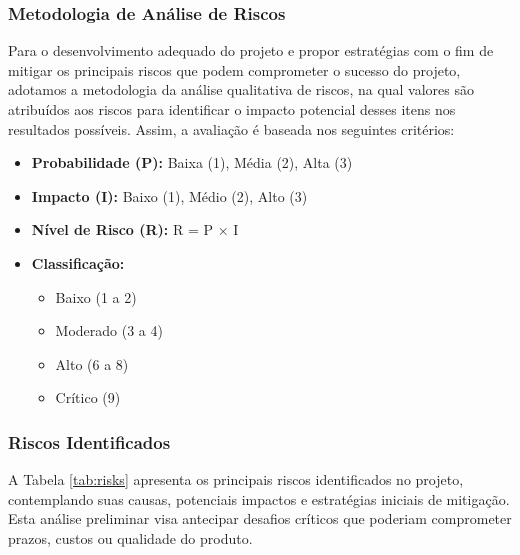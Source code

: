 \documentclass[a5paper, 12pt]{article}
\begin{document}
\subsubsection{Metodologia de Análise de Riscos}

Para o desenvolvimento adequado do projeto e propor estratégias com o fim de mitigar os principais riscos que podem comprometer o sucesso do projeto, adotamos a metodologia da análise qualitativa de riscos, na qual valores são atribuídos aos riscos para identificar o impacto potencial desses itens nos resultados possíveis. Assim, a avaliação é baseada nos seguintes critérios:

\begin{itemize}
    \item \textbf{Probabilidade (P):} Baixa (1), Média (2), Alta (3)
    \item \textbf{Impacto (I):} Baixo (1), Médio (2), Alto (3)
    \item \textbf{Nível de Risco (R):} R = P × I
    \item \textbf{Classificação:}
    \begin{itemize}
        \item Baixo (1 a 2)
        \item Moderado (3 a 4)
        \item Alto (6 a 8)
        \item Crítico (9)
    \end{itemize}
\end{itemize}

\subsubsection{Riscos Identificados}
A Tabela \ref{tab:risks} apresenta os principais riscos identificados no projeto, contemplando suas causas, potenciais impactos e estratégias iniciais de mitigação. Esta análise preliminar visa antecipar desafios críticos que poderiam comprometer prazos, custos ou qualidade do produto. 
\end{document}
